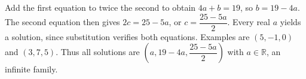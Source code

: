 Add the first equation to twice the second to obtain $4a+b=19$, so $b=19-4a$. The second equation then gives $2c=25-5a$, or $c=\dfrac{25-5a}{2}$. Every real $a$ yields a solution, since substitution verifies both equations. Examples are $\boxed{(5,-1,0)}$ and $\boxed{(3,7,5)}$. Thus all solutions are $(a,19-4a,\dfrac{25-5a}{2})$ with $a\in\mathbb R$, an infinite family.
